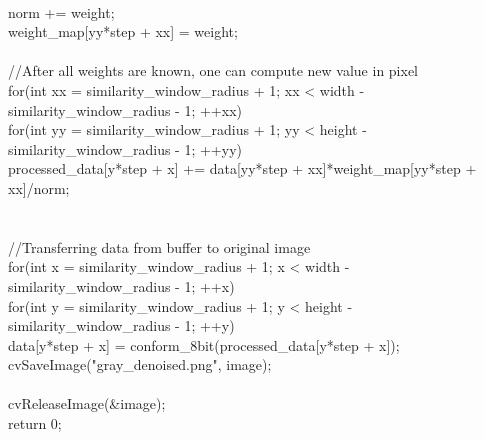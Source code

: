 \documentclass[a4paper,12pt]{article}
\begin{document}
{{{{\\                    norm += weight;
\\                    weight\_map[yy*step + xx] = weight;
\\				}
\\			//After all weights are known, one can compute new value in pixel
\\			for(int xx = similarity\_window\_radius + 1; xx < width - similarity\_window\_radius - 1; ++xx)
\\				for(int yy = similarity\_window\_radius + 1; yy < height - similarity\_window\_radius - 1; ++yy)
\\                    processed\_data[y*step + x] += data[yy*step + xx]*weight\_map[yy*step + xx]/norm;
\\		}
\\	}
\\	//Transferring data from buffer to original image
\\	for(int x = similarity\_window\_radius + 1; x < width - similarity\_window\_radius - 1; ++x)
\\		for(int y = similarity\_window\_radius + 1; y < height - similarity\_window\_radius - 1; ++y)
\\			data[y*step + x] = conform\_8bit(processed\_data[y*step + x]);
\\	cvSaveImage("gray\_denoised.png", image);
\\	
\\	cvReleaseImage(\&image);
\\	return 0;
\\}
\end{document}
